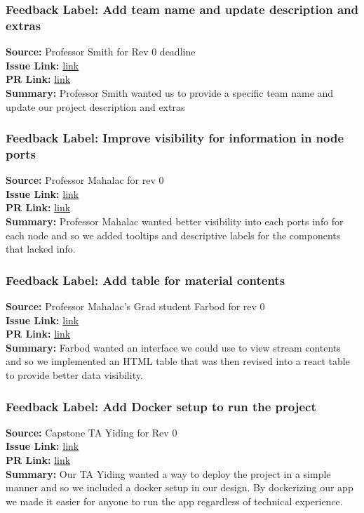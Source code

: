 \documentclass{article}
\begin{document}
    \subsubsection*{Feedback Label: Add team name and update description and extras}
    \textbf{Source:} Professor Smith for Rev 0 deadline \\
    \textbf{Issue Link:} \href{https://github.com/MadhuranS/capstone/issues/144}{link} \\
    \textbf{PR Link:} \href{https://github.com/MadhuranS/capstone/pull/171}{link} \\
    \textbf{Summary:} Professor Smith wanted us to provide a specific team name and update our project description and extras

    \subsubsection*{Feedback Label: Improve visibility for information in node ports}
    \textbf{Source:} Professor Mahalac for rev 0 \\
    \textbf{Issue Link:} \href{https://github.com/MadhuranS/capstone/issues/255}{link} \\
    \textbf{PR Link:} \href{https://github.com/MadhuranS/capstone/pull/295}{link} \\
    \textbf{Summary:} Professor Mahalac wanted better visibility into each ports info for each node and so we added tooltips and descriptive labels for the components that lacked info. 

    \subsubsection*{Feedback Label: Add table for material contents}
    \textbf{Source:} Professor Mahalac's Grad student Farbod for rev 0 \\
    \textbf{Issue Link:} \href{https://github.com/MadhuranS/capstone/issues/229}{link} \\
    \textbf{PR Link:} \href{https://github.com/MadhuranS/capstone/pull/263}{link} \\
    \textbf{Summary:} Farbod wanted an interface we could use to view stream contents and so we implemented an HTML table that was then revised into a react table to provide better data visibility. 

    \subsubsection*{Feedback Label: Add Docker setup to run the project}
    \textbf{Source:} Capstone TA Yiding for Rev 0\\
    \textbf{Issue Link:} \href{https://github.com/MadhuranS/capstone/issues/206}{link} \\
    \textbf{PR Link:} \href{https://github.com/MadhuranS/capstone/pull/210}{link} \\
    \textbf{Summary:} Our TA Yiding wanted a way to deploy the project in a simple manner and so we included a docker setup in our design. By dockerizing our app we made it easier for anyone to run the app regardless of technical experience. 
\end{document}
